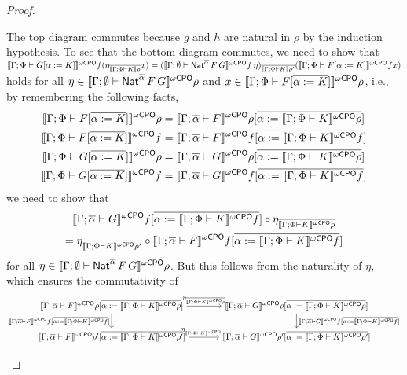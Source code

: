 \documentclass[acmsmall,review,anonymous]{acmart}
\theoremstyle{definition}
\renewcommand{\id}{\mathit{id}}
\begin{document}
\begin{proof}
\begin{itemize}
\noindent
The top diagram commutes because $g$ and $h$ are natural in $\rho$ by
the induction hypothesis.
To see that the bottom diagram commutes,
we need to show that
$\llbracket{\Gamma;\Phi \vdash G [\overline{\alpha := K}]}\rrbracket^{{\omega\mathsf{CPO}}}f
(\eta_{\overline{\llbracket{\Gamma;\Phi \vdash K}\rrbracket\rho}} x) =
(\llbracket{\Gamma; \emptyset \vdash \mathsf{Nat}^{\overline{\alpha}} \,F \,G}\rrbracket^{{\omega\mathsf{CPO}}} f\, \eta
)_{\overline{\llbracket{\Gamma;\Phi \vdash K}\rrbracket\rho'}}
(\llbracket{\Gamma;\Phi \vdash F [\overline{\alpha := K}]}\rrbracket^{{\omega\mathsf{CPO}}}f x)$
holds for all $\eta \in \llbracket{\Gamma; \emptyset \vdash
  \mathsf{Nat}^{\overline{\alpha}} \,F \,G}\rrbracket^{{\omega\mathsf{CPO}}}\rho$ and $x \in
\llbracket{\Gamma;\Phi \vdash F [\overline{\alpha := K}]}\rrbracket^{{\omega\mathsf{CPO}}}\rho$,
i.e.,
by remembering the following facts,
\begin{align*}
\llbracket{\Gamma;\Phi \vdash F[\overline{\alpha := K}]}\rrbracket^{{\omega\mathsf{CPO}}}\rho
&= \llbracket{\Gamma; \overline{\alpha} \vdash F}\rrbracket^{{\omega\mathsf{CPO}}}\rho[\overline{\alpha :=
    \llbracket{\Gamma;\Phi \vdash K}\rrbracket^{{\omega\mathsf{CPO}}}\rho}] \\
\llbracket{\Gamma;\Phi \vdash F[\overline{\alpha := K}]}\rrbracket^{{\omega\mathsf{CPO}}}f
&= \llbracket{\Gamma; \overline{\alpha} \vdash F}\rrbracket^{{\omega\mathsf{CPO}}}
  f [\overline{\alpha := \llbracket{\Gamma;\Phi \vdash K}\rrbracket^{{\omega\mathsf{CPO}}}f}] \\
\llbracket{\Gamma;\Phi \vdash G[\overline{\alpha := K}]}\rrbracket^{{\omega\mathsf{CPO}}}\rho
&= \llbracket{\Gamma; \overline{\alpha} \vdash G}\rrbracket^{{\omega\mathsf{CPO}}}\rho[\overline{\alpha :=
    \llbracket{\Gamma;\Phi \vdash K}\rrbracket^{{\omega\mathsf{CPO}}}\rho}] \\
\llbracket{\Gamma;\Phi \vdash G[\overline{\alpha := K}]}\rrbracket^{{\omega\mathsf{CPO}}}f
&= \llbracket{\Gamma; \overline{\alpha} \vdash
  G}\rrbracket^{{\omega\mathsf{CPO}}} f [\overline{\alpha := \llbracket{\Gamma;\Phi \vdash K}\rrbracket^{{\omega\mathsf{CPO}}}f}]
\end{align*}
we need to show that
\begin{multline*}
\llbracket{\Gamma; \overline{\alpha} \vdash G}\rrbracket^{{\omega\mathsf{CPO}}} f[\overline{\alpha := \llbracket{\Gamma;\Phi \vdash K}\rrbracket^{{\omega\mathsf{CPO}}} f }]
  \circ
\eta_{\overline{\llbracket{\Gamma;\Phi \vdash K}\rrbracket^{{\omega\mathsf{CPO}}}\rho}} \\
=
\eta_{\overline{\llbracket{\Gamma;\Phi \vdash K}\rrbracket^{{\omega\mathsf{CPO}}}\rho'}}
\circ
\llbracket{\Gamma; \overline{\alpha} \vdash F}\rrbracket^{{\omega\mathsf{CPO}}} f [\overline{\alpha := \llbracket{\Gamma;\Phi \vdash K}\rrbracket^{{\omega\mathsf{CPO}}}f}]
\end{multline*}
for all $\eta \in \llbracket{\Gamma;\emptyset \vdash
  \mathsf{Nat}^{\overline{\alpha}} \,F \,G}\rrbracket^{{\omega\mathsf{CPO}}}\rho$.
But this follows from the naturality of $\eta$, which ensures the commutativity of
{\footnotesize
\[\begin{tikzcd}[column sep = large]
\oCPOsem{\Gamma; \ol{\alpha} \vdash F}\rho[\ol{\alpha :=
    \oCPOsem{\Gamma;\Phi \vdash K}\rho}] \ar[r,
  "{\;\;\;\eta_{\ol{\oCPOsem{\Gamma;\Phi \vdash K}\rho}}\;\;\; }"]
\ar[d, "{\oCPOsem{\Gamma; \ol{\alpha} \vdash F} f [\ol{\alpha := 
        \oCPOsem{\Gamma;\Phi \vdash K}f}]}"']
& \oCPOsem{\Gamma;
  \ol{\alpha} \vdash G}\rho[\ol{\alpha := \oCPOsem{\Gamma;\Phi \vdash
      K}\rho}]
\ar[d, "{\oCPOsem{\Gamma; \ol{\alpha} \vdash G} f [\ol{\alpha := 
        \oCPOsem{\Gamma;\Phi \vdash K}f}]}"]\\
\oCPOsem{\Gamma; \ol{\alpha} \vdash F}\rho'[\ol{\alpha :=
    \oCPOsem{\Gamma;\Phi \vdash K}\rho'}] \ar[r,
  "{\eta_{\ol{\oCPOsem{\Gamma;\Phi \vdash K}\rho'}} }"]
& \oCPOsem{\Gamma; \ol{\alpha} \vdash G}\rho'[\ol{\alpha :=
    \oCPOsem{\Gamma;\Phi \vdash K}\rho'}]
\end{tikzcd}\]}


\end{itemize}
\end{proof}
\end{document}
